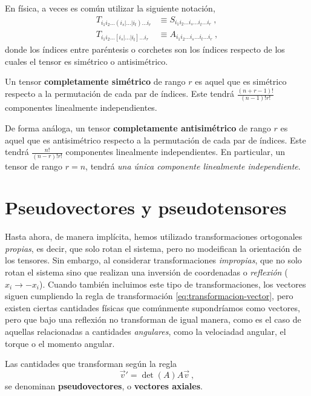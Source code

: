 \begin{itemize}
    En física, a veces es común utilizar la siguiente notación,
    \begin{align}
        T_{i_1 i_2 \dots (i_s| \dots |i_t) \dots i_r} & \equiv S_{i_1 i_2 \dots i_s \dots i_t \dots i_r} \ , \\
        T_{i_1 i_2 \dots [i_s| \dots |i_t] \dots i_r} & \equiv A_{i_1 i_2 \dots i_s \dots i_t \dots i_r} \ ,
    \end{align}
    donde los índices entre paréntesis o corchetes son los índices respecto de los cuales el tensor es simétrico o antisimétrico.

    Un tensor \textbf{completamente simétrico} de rango $r$ es aquel que es simétrico respecto a la permutación de cada par de índices. Este tendrá $\frac{(n+r-1)!}{(n-1)! r!}$ componentes linealmente independientes.

    De forma análoga, un tensor \textbf{completamente antisimétrico} de rango $r$ es aquel que es antisimétrico respecto a la permutación de cada par de índices. Este tendrá $\frac{n!}{(n-r)! r!}$ componentes linealmente independientes. En particular, un tensor de rango $r=n$, tendrá \emph{una única componente linealmente independiente}.
\end{itemize}

\section{Pseudovectores y pseudotensores}

Hasta ahora, de manera implícita, hemos utilizado transformaciones ortogonales \emph{propias}, es decir, que solo rotan el sistema, pero no modeifican la orientación de los tensores. Sin embargo, al considerar transformaciones \emph{impropias}, que no solo rotan el sistema sino que realizan una inversión de coordenadas o \emph{reflexión} ($x_i \to -x_i$). Cuando también incluimos este tipo de transformaciones, los vectores siguen cumpliendo la regla de transformación \eqref{eq:transformacion-vector}, pero existen ciertas cantidades físicas que comúnmente supondríamos como vectores, pero que bajo una reflexión no transforman de igual manera, como es el caso de aquellas relacionadas a cantidades \emph{angulares}, como la velociadad angular, el torque o el momento angular.

\begin{defi}
    Las cantidades que transforman según la regla
    \begin{equation} \label{eq:pseudovector}
        \vec{v}' = \det(A) A \vec{v} \ ,
    \end{equation}
    se denominan \textbf{pseudovectores}, o \textbf{vectores axiales}.
\end{defi}

